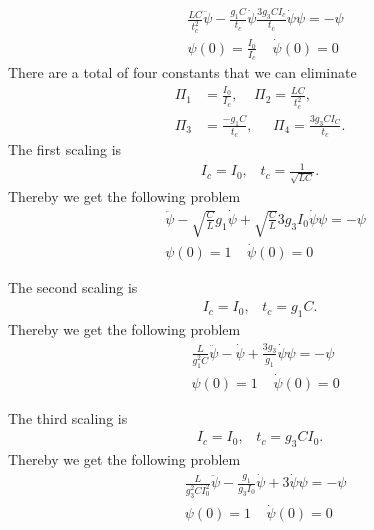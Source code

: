 \documentclass[a4paper]{article}
\begin{document}
\begin{align}
    &\frac{LC}{t_c^2}\ddot{\psi} - \frac{g_1C}{t_c}\dot{\psi}
    \frac{3g_3CI_c}{t_c}\dot{\psi}\psi = -\psi\\
    &\psi(0) = \frac{I_0}{I_c} \;\;\;\; \dot{\psi}(0) = 0
\end{align}
There are a total of four constants that we can eliminate
\begin{align}
    \Pi_1 &= \frac{I_0}{I_c},\;\;\;\;
    \Pi_2 = \frac{LC}{t_c^2},\nonumber\\
    \Pi_3 &= \frac{-g_1C}{t_c},\;\;\;\;\;
    \Pi_4 = \frac{3g_3CI_C}{t_c}.
\end{align}
The first scaling is
\begin{align}
    I_c = I_0,\;\;\; t_c=\frac{1}{\sqrt{LC}}.
\end{align}
Thereby we get the following problem
\begin{align}
    &\ddot{\psi}
    -\sqrt{\frac{C}{L}}g_1\dot{\psi}+\sqrt{\frac{C}{L}}3g_3I_0\dot{\psi}\psi
    = -\psi\\
    &\psi(0) = 1 \;\;\;\; \dot{\psi}(0) = 0
\end{align}


The second scaling is
\begin{align}
    I_c = I_0,\;\;\; t_c=g_1C.
\end{align}
Thereby we get the following problem
\begin{align}
    &\frac{L}{g_1^2C}\ddot{\psi}
    -\dot{\psi}+\frac{3g_3}{g_1}\dot{\psi}\psi
    = -\psi\\
    &\psi(0) = 1 \;\;\;\; \dot{\psi}(0) = 0
\end{align}

The third scaling is
\begin{align}
    I_c = I_0,\;\;\; t_c=g_3CI_0.
\end{align}
Thereby we get the following problem
\begin{align}
    &\frac{L}{g_3^2CI_0^2}\ddot{\psi}
    -\frac{g_1}{g_3I_0}\dot{\psi}+3\dot{\psi}\psi
    = -\psi\\
    &\psi(0) = 1 \;\;\;\; \dot{\psi}(0) = 0
\end{align}
\end{document}

